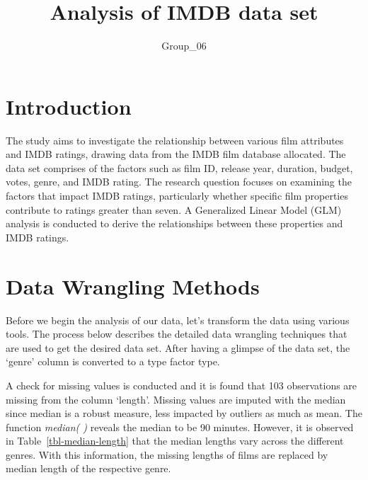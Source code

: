 \documentclass[
  letterpaper,
  DIV=11,
  numbers=noendperiod]{scrartcl}
\title{Analysis of IMDB data set}
\author{Group\_06}
\date{}
\begin{document}
\maketitle
\ifdefined\Shaded\renewenvironment{Shaded}{\begin{tcolorbox}[interior hidden, boxrule=0pt, borderline west={3pt}{0pt}{shadecolor}, breakable, frame hidden, enhanced, sharp corners]}{\end{tcolorbox}}\fi

\hypertarget{sec-Intro}{%
\section{Introduction}\label{sec-Intro}}

The study aims to investigate the relationship between various film
attributes and IMDB ratings, drawing data from the IMDB film database
allocated. The data set comprises of the factors such as film ID,
release year, duration, budget, votes, genre, and IMDB rating. The
research question focuses on examining the factors that impact IMDB
ratings, particularly whether specific film properties contribute to
ratings greater than seven. A Generalized Linear Model (GLM) analysis is
conducted to derive the relationships between these properties and IMDB
ratings.

\hypertarget{sec-DW}{%
\section{Data Wrangling Methods}\label{sec-DW}}

Before we begin the analysis of our data, let's transform the data using
various tools. The process below describes the detailed data wrangling
techniques that are used to get the desired data set. After having a
glimpse of the data set, the `genre' column is converted to a type
factor type.

A check for missing values is conducted and it is found that 103
observations are missing from the column `length'. Missing values are
imputed with the median since median is a robust measure, less impacted
by outliers as much as mean. The function \emph{median( )} reveals the
median to be 90 minutes. However, it is observed in
Table~\ref{tbl-median-length} that the median lengths vary across the
different genres. With this information, the missing lengths of films
are replaced by median length of the respective genre.
\end{document}
